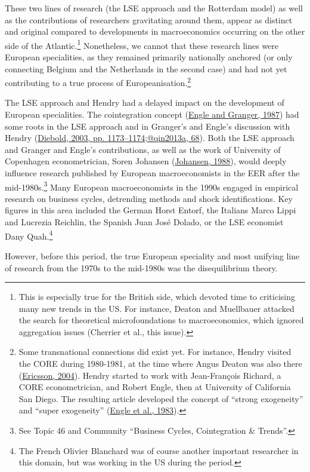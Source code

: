 \documentclass[
  12pt,
  onecolumn]{article}
\begin{document}
These two lines of research (the LSE approach and the Rotterdam model) as well as the contributions of researchers gravitating around them, appear as distinct and original compared to developments in macroeconomics occurring on the other side of the Atlantic.\footnote{This is especially true for the British side, which devoted time to criticising many new trends in the US. For instance, Deaton and Muellbauer attacked the search for theoretical microfoundations to macroeconomics, which ignored aggregation issues (Cherrier et al., this issue).} Nonetheless, we cannot that these research lines were European specialities, as they remained primarily nationally anchored (or only connecting Belgium and the Netherlands in the second case) and had not yet contributing to a true process of Europeanisation.\footnote{Some transnational connections did exist yet. For instance, Hendry visited the CORE during 1980-1981, at the time where Angus Deaton was also there (\protect\hyperlink{ref-ericsson2004}{Ericsson, 2004}). Hendry started to work with Jean-François Richard, a CORE econometrician, and Robert Engle, then at University of California San Diego. The resulting article developed the concept of ``strong exogeneity'' and ``super exogeneity'' (\protect\hyperlink{ref-engle1983}{Engle et al., 1983}).}

The LSE approach and Hendry had a delayed impact on the development of European specialities. The cointegration concept (\protect\hyperlink{ref-engle1987}{Engle and Granger, 1987}) had some roots in the LSE approach and in Granger's and Engle's discussion with Hendry (\protect\hyperlink{ref-diebold2003}{Diebold, 2003, pp. 1173--1174;@qin2013a, 68}). Both the LSE approach and Granger and Engle's contributions, as well as the work of University of Copenhagen econometrician, Soren Johansen (\protect\hyperlink{ref-johansen1988}{Johansen, 1988}), would deeply influence research published by European macroeconomists in the EER after the mid-1980s.\footnote{See Topic 46 and Community ``Business Cycles, Cointegration \& Trends''.} Many European macroeconomists in the 1990s engaged in empirical research on business cycles, detrending methods and shock identifications. Key figures in this area included the German Horst Entorf, the Italians Marco Lippi and Lucrezia Reichlin, the Spanish Juan José Dolado, or the LSE economist Dany Quah.\footnote{The French Olivier Blanchard was of course another important researcher in this domain, but was working in the US during the period.}

However, before this period, the true European speciality and most unifying line of research from the 1970s to the mid-1980s was the disequilibrium theory.
\end{document}
